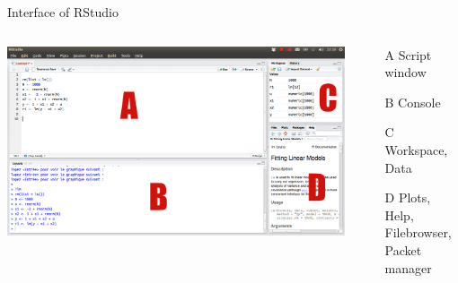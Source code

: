 \documentclass[xcolor=dvipsnames, aspectratio = 169]{beamer}
\begin{document}
\begin{frame}{Interface of RStudio}
\begin{columns}[T]
	\begin{column}{0.6\textwidth}
	\includegraphics[scale=0.65]{Rstudio_interface1}
	\end{column}
	\begin{column}{0.4\textwidth}
	\begin{enumerate}
		\item[A] Script window
		\item[B] Console
		\item[C] Workspace, Data
		\item[D] Plots, Help, Filebrowser, Packet manager
	\end{enumerate}
	\end{column}
\end{columns}
\end{frame}
\end{document}
